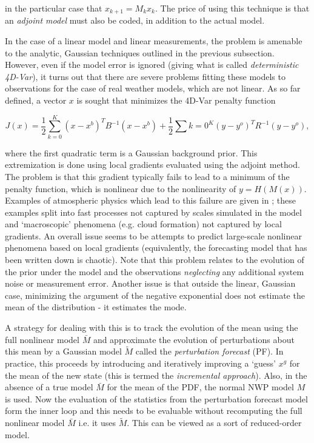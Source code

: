 in the particular case that $x_{k+1} = M_k x_k$.  
The price of using this technique is that an {\it adjoint model} must also be coded, in addition to the actual model.

In the case of a linear model and linear measurements, the problem is amenable to the analytic, Gaussian techniques outlined in the previous subsection.  
However, even if the model error is ignored (giving what is called {\it deterministic 4D-Var}), it turns out that there are severe problems fitting these models to observations for the case of real weather models, which are not linear.  
As so far defined, a vector $x$ is sought that minimizes the 4D-Var penalty function

\begin{equation}
J(x) = \frac{1}{2} \sum_{k=0}^K \left ( x-x^b \right )^T B^{-1} \left ( x-x^b \right ) + \frac{1}{2} \sum{k=0}^K \left ( y-y^o \right )^T R^{-1} \left ( y-y^o \right ),
\end{equation}

where the first quadratic term is a Gaussian background prior.  
This extremization is done using local gradients evaluated using the adjoint method.  
The problem is that this gradient typically fails to lead to a minimum of the penalty function, which is nonlinear due to the nonlinearity of $y=H(M(x))$.  
Examples of atmospheric physics which lead to this failure are given in \cite{lorenc2012}; these examples split into fast processes not captured by scales simulated in the model and `macroscopic' phenomena (e.g. cloud formation) not captured by local gradients.  
An overall issue seems to be attempts to predict large-scale nonlinear phenomena based on local gradients (equivalently, the forecasting model that has been written down is chaotic).  
Note that this problem relates to the evolution of the prior under the model and the observations {\it neglecting} any additional system noise or measurement error.  Another issue is that outside the linear, Gaussian case, minimizing the argument of the negative exponential does not estimate the mean of the distribution - it estimates the mode.

A strategy for dealing with this is to track the evolution of the mean using the full nonlinear model $\bar{M}$ and approximate the evolution of perturbations about this mean by a Gaussian model $\tilde{M}$ called the {\it perturbation forecast} (PF).  
In practice, this proceeds by introducing and iteratively improving a `guess' $x^g$ for the mean of the new state (this is termed the {\it incremental approach}).  Also, in the absence of a true model $\bar{M}$ for the mean of the PDF, the normal NWP model $M$ is used.  
Now the evaluation of the statistics from the perturbation forecast model form the inner loop and this needs to be evaluable without recomputing the full nonlinear model $\bar{M}$ i.e. it uses $\tilde{M}$.  
This can be viewed as a sort of reduced-order model.

